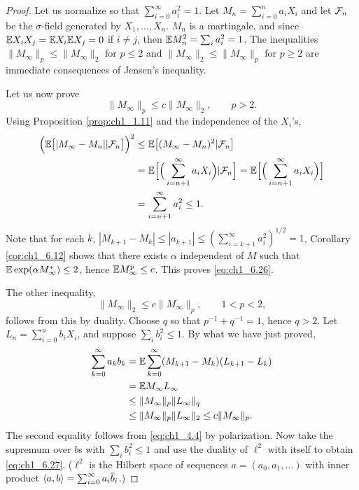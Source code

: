 \begin{proof}
Let us normalize so that $\sum_{i=0}^{\infty} a_i^2 = 1$. Let $M_n = \sum_{i=0}^n a_iX_i$ and let $\mathcal{F}_n$ be the $\sigma$-field generated by $X_1,\ldots,X_n$. $M_n$ is a martingale, and since $\mathbb{E} X_iX_j = \mathbb{E} X_i\mathbb{E} X_j = 0$ if $i \neq j$, then $\mathbb{E} M_n^2 = \sum_i a_i^2 = 1$. The inequalities $\|M_\infty\|_p \leq \|M_\infty\|_2$ for $p \leq 2$ and $\|M_\infty\|_2 \leq \|M_\infty\|_p$ for $p \geq 2$ are immediate consequences of Jensen's inequality.

Let us now prove
\begin{equation}\label{eq:ch1_6.26}
    \|M_\infty\|_p \leq c\|M_\infty\|_2, \qquad p > 2.
\end{equation}
Using Proposition \ref{prop:ch1_1.11} and the independence of the $X_i$'s,
\begin{align*}
    \Big(\mathbb{E}\big[|M_\infty - M_n|| \mathcal{F}_n\big]\Big)^2 &\leq \mathbb{E}\big[(M_\infty - M_n)^2| \mathcal{F}_n\big] \\
    &= \mathbb{E}\Big[\Big(\sum_{i=n+1}^\infty a_iX_i\Big)| \mathcal{F}_n\Big]=\mathbb{E}\Big[\Big(\sum_{i=n+1}^\infty a_iX_i\Big)\Big] \\
    &=\sum_{i=n+1}^\infty a_i^2\le 1.
\end{align*}
Note that for each $k$, $|M_{k+1} - M_k| \leq |a_{k+1}| \leq (\sum_{i=k+1}^{\infty} a_i^2)^{1/2} = 1$, Corollary \ref{cor:ch1_6.12} shows that there exists $\alpha$ independent of $M$ such that $\mathbb{E} \exp(\alpha M_\infty^*) \leq 2$, hence $\mathbb{E} M_\infty^p \leq c$. This proves \eqref{eq:ch1_6.26}.

The other inequality,
\begin{equation}\label{eq:ch1_6.27}
    \|M_\infty\|_2 \leq c\|M_\infty\|_p, \qquad 1 < p < 2,
\end{equation}
follows from this by duality. Choose $q$ so that $p^{-1} + q^{-1} = 1$, hence $q > 2$. Let $L_n = \sum_{i=0}^n b_iX_i$, and suppose $\sum_i b_i^2 \leq 1$. By what we have just proved,
\begin{align*}
    \sum_{k=0}^{\infty} a_kb_k &= \mathbb{E} \sum_{k=0}^{\infty} (M_{k+1} - M_k)(L_{k+1} - L_k) \\
    &= \mathbb{E} M_\infty L_\infty \\
    &\leq \|M_\infty\|_p\|L_\infty\|_q \\
    &\leq \|M_\infty\|_p\|L_\infty\|_2 \leq c\|M_\infty\|_p.
\end{align*}
The second equality follows from \eqref{eq:ch1_4.4} by polarization. Now take the supremum over $b$s with $\sum_i b_i^2 \leq 1$ and use the duality of $\ell^2$ with itself to obtain \eqref{eq:ch1_6.27}. ($\ell^2$ is the Hilbert space of sequences $a = (a_0,a_1,\ldots)$ with inner product $\langle a,b \rangle = \sum_{i=0}^{\infty} a_i\overline{b}_i$.)
\end{proof}

